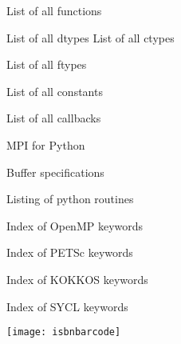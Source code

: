\documentclass[11pt,letterpaper,twoside,openany]{boek3}
\begin{document}
 {List of all functions}

 {List of all dtypes}
%
 {List of all ctypes}

 {List of all ftypes}

 {List of all constants}

 {List of all callbacks}


 {MPI for Python}

 {Buffer specifications}

{\small
  
  
  
  
}

 {Listing of python routines}

\begin{multicols}{3}
\small
{}




\end{multicols}

 {Index of OpenMP keywords}

\begin{multicols*}{2}
\printindex[omp]
\end{multicols*}

 {Index of PETSc keywords}

\begin{multicols*}{2}
\printindex[petsc]
\end{multicols*}

 {Index of KOKKOS keywords}

\begin{multicols*}{2}
\printindex[kokkos]
\end{multicols*}

 {Index of SYCL keywords}

\begin{multicols*}{2}
\printindex[sycl]
\end{multicols*}

\hbox{}\vfill
\texttt{[image: isbnbarcode]}

\closeout\chapterlist
\end{document}
